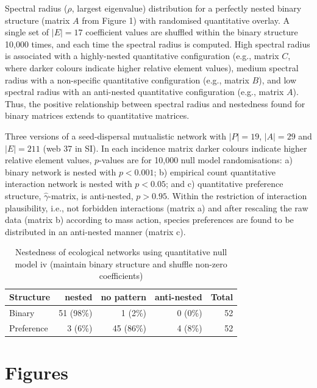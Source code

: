 \documentclass[pdftex]{nature}
\begin{document}
Spectral radius ($\rho$, largest eigenvalue) distribution for a
perfectly nested binary structure (matrix $A$ from Figure 1) with
randomised quantitative overlay.  A single set of $|E|=17$ coefficient
values are shuffled within the binary structure 10,000 times, and each
time the spectral radius is computed.  High spectral radius is
associated with a highly-nested quantitative configuration (e.g.,
matrix $C$, where darker colours indicate higher relative element
values), medium spectral radius with a non-specific quantitative
configuration (e.g., matrix $B$), and low spectral radius with an
anti-nested quantitative configuration (e.g., matrix $A$).  Thus, the
positive relationship between spectral radius and nestedness found for
binary matrices extends to quantitative matrices.

  Three versions of a
seed-dispersal mutualistic network with $|P|=19$, $|A|=29$ and
$|E|=211$ (web 37 in SI).  In each incidence matrix darker colours
indicate higher relative element values, $p$-values are for 10,000
null model randomisations: a) binary network is nested with $p<0.001$;
b) empirical count quantitative interaction network is nested with
$p<0.05$; and c) quantitative preference structure,
$\hat{\gamma}$-matrix, is anti-nested, $p>0.95$.  Within the
restriction of interaction plausibility, i.e., not forbidden
interactions (matrix a) and after rescaling the raw data (matrix b)
according to mass action, species preferences are found to be
distributed in an anti-nested manner (matrix c).

\begin{table}
\caption{Nestedness of ecological networks using quantitative null
  model iv
\newline
	(maintain binary structure and shuffle non-zero coefficients)}
\centering
\begin{tabular*}{0.66\hsize}
{lrrrr}
Structure & nested & no pattern & anti-nested & Total\\
\hline
Binary & 51 (98\%) & 1 (2\%) & 0 (0\%) & 52\\
Preference & 3 (6\%) & 45 (86\%) & 4 (8\%) & 52\\
\hline
\end{tabular*}
\end{table}


\clearpage
\section*{Figures}
\end{document}
